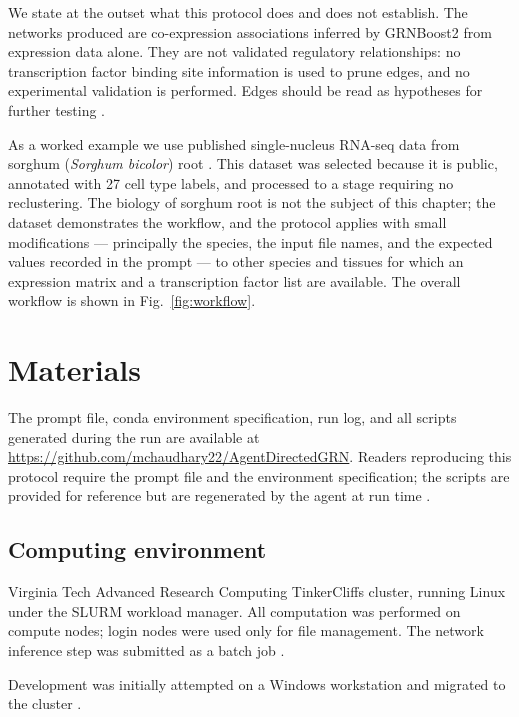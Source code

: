 We state at the outset what this protocol does and does not establish. The networks produced are co-expression associations inferred by GRNBoost2 \cite{moerman2019} from expression data alone. They are not validated regulatory relationships: no transcription factor binding site information is used to prune edges, and no experimental validation is performed. Edges should be read as hypotheses for further testing .

As a worked example we use published single-nucleus RNA-seq data from sorghum (\textit{Sorghum bicolor}) root \cite{baumgart2025}. This dataset was selected because it is public, annotated with 27 cell type labels, and processed to a stage requiring no reclustering. The biology of sorghum root is not the subject of this chapter; the dataset demonstrates the workflow, and the protocol applies with small modifications --- principally the species, the input file names, and the expected values recorded in the prompt --- to other species and tissues for which an expression matrix and a transcription factor list are available. The overall workflow is shown in Fig.~\ref{fig:workflow}.

\section{Materials}

The prompt file, conda environment specification, run log, and all scripts generated during the run are available at \url{https://github.com/mchaudhary22/AgentDirectedGRN}. Readers reproducing this protocol require the prompt file and the environment specification; the scripts are provided for reference but are regenerated by the agent at run time .

\subsection{Computing environment}

Virginia Tech Advanced Research Computing TinkerCliffs cluster, running Linux under the SLURM workload manager. All computation was performed on compute nodes; login nodes were used only for file management. The network inference step was submitted as a batch job .

Development was initially attempted on a Windows workstation and migrated to the cluster .

